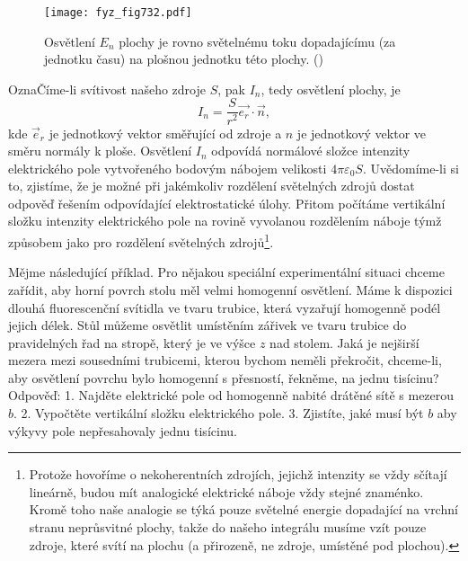     \begin{figure}[ht!] %
      \centering
      \texttt{[image: fyz\_fig732.pdf]}
      \caption{Osvětlení \(E_n\) plochy je rovno světelnému toku dopadajícímu (za jednotku času) na
        plošnou jednotku této plochy. (\cite[s.~220]{Feynman02})}
      \label{fyz:fig732}
    \end{figure}

    OznaČíme-li svítivost našeho zdroje \(S\), pak \(I_n\), tedy osvětlení plochy, je
    \begin{equation*}
      I_n=\dfrac{S}{r^2}\vec{e_r}⋅\vec{n},
    \end{equation*}
    kde \(\vec{e}_r\) je jednotkový vektor směřující od zdroje a \(n\) je jednotkový vektor ve směru
    normály k ploše. Osvětlení \(I_n\) odpovídá normálové složce intenzity elektrického pole
    vytvořeného bodovým nábojem velikosti \(4π\varepsilon_0S\). Uvědomíme-li si to, zjistíme, že je možné při
    jakémkoliv rozdělení světelných zdrojů dostat odpověď řešením odpovídající elektrostatické
    úlohy. Přitom počítáme vertikální složku intenzity elektrického pole na rovině vyvolanou
    rozdělením náboje týmž způsobem jako pro rozdělení světelných zdrojů\footnote{Protože hovoříme o
    nekoherentních zdrojích, jejichž intenzity se vždy sčítají lineárně, budou mít analogické
    elektrické náboje vždy stejné znaménko. Kromě toho naše analogie se týká pouze světelné energie
    dopadající na vrchní stranu neprůsvitné plochy, takže do našeho integrálu musíme vzít pouze
    zdroje, které svítí na plochu (a přirozeně, ne zdroje, umístěné pod plochou).}.

    Mějme následující příklad. Pro nějakou speciální experimentální situaci chceme zařídit, aby
    horní povrch stolu měl velmi homogenní osvětlení. Máme k dispozici dlouhá fluorescenční svítidla
    ve tvaru trubice, která vyzařují homogenně podél jejich délek. Stůl můžeme osvětlit umístěním
    zářivek ve tvaru trubice do pravidelných řad na stropě, který je ve výšce \(z\) nad stolem. Jaká
    je nejširší mezera mezi sousedními trubicemi, kterou bychom neměli překročit, chceme-li, aby
    osvětlení povrchu bylo homogenní s přesností, řekněme, na jednu tisícinu? Odpověď: 1. Najděte
    elektrické pole od homogenně nabité drátěné sítě s mezerou \(b\). 2. Vypočtěte vertikální složku
    elektrického pole. 3. Zjistíte, jaké musí být \(b\) aby výkyvy pole nepřesahovaly jednu
    tisícinu.

